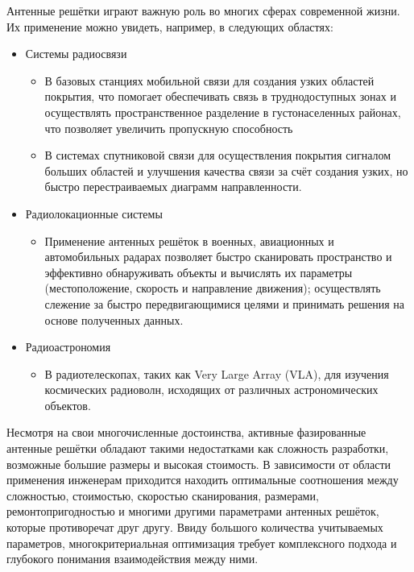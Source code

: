 \label{chap:introduction}

Антенные решётки играют важную роль во многих сферах современной жизни. Их применение можно увидеть, например, в следующих областях:

\begin{itemize}
      \item Системы радиосвязи
            \begin{itemize}
                  \item В базовых станциях мобильной связи для создания узких областей покрытия, что помогает
                        обеспечивать связь в труднодоступных зонах и осуществлять пространственное
                        разделение в густонаселенных районах, что позволяет увеличить пропускную способность
                  \item В системах спутниковой связи для осуществления покрытия сигналом больших областей
                        и улучшения качества связи за счёт создания узких, но быстро перестраиваемых диаграмм направленности.
            \end{itemize}
      \item Радиолокационные системы
            \begin{itemize}
                  \item Применение антенных решёток в военных, авиационных и автомобильных радарах позволяет быстро сканировать пространство
                        и эффективно обнаруживать объекты и вычислять их параметры (местоположение, скорость и направление движения);
                        осуществлять слежение за быстро передвигающимися целями и принимать решения на основе полученных данных.
            \end{itemize}
      \item Радиоастрономия
            \begin{itemize}
                  \item В радиотелескопах, таких как Very Large Array (VLA), для изучения космических
                        радиоволн, исходящих от различных астрономических объектов.
            \end{itemize}
\end{itemize}

Несмотря на свои многочисленные достоинства, активные фазированные антенные решётки обладают такими недостатками
как сложность разработки, возможные большие размеры и высокая стоимость. В зависимости от области применения инженерам
приходится находить оптимальные соотношения между сложностью, стоимостью, скоростью сканирования, размерами, ремонтопригодностью
и многими другими параметрами антенных решёток, которые противоречат друг другу. Ввиду большого количества учитываемых параметров,
многокритериальная оптимизация требует комплексного подхода и глубокого понимания взаимодействия между ними.


